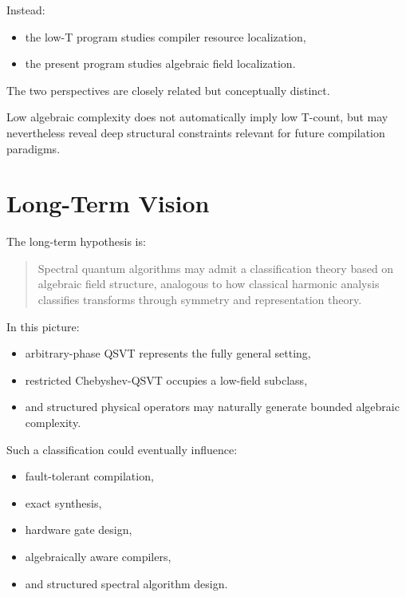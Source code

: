 \documentclass[12pt,a4paper]{article}
\begin{document}
Instead:

\begin{itemize}
    \item the low-T program studies compiler resource localization,
    \item the present program studies algebraic field localization.
\end{itemize}

The two perspectives are closely related but conceptually distinct.

Low algebraic complexity does not automatically imply low T-count, but may nevertheless reveal deep structural constraints relevant for future compilation paradigms.


\section{Long-Term Vision}

The long-term hypothesis is:

\begin{quote}
Spectral quantum algorithms may admit a classification theory based on algebraic field structure, analogous to how classical harmonic analysis classifies transforms through symmetry and representation theory.
\end{quote}

In this picture:

\begin{itemize}
    \item arbitrary-phase QSVT represents the fully general setting,
    \item restricted Chebyshev-QSVT occupies a low-field subclass,
    \item and structured physical operators may naturally generate bounded algebraic complexity.
\end{itemize}

Such a classification could eventually influence:

\begin{itemize}
    \item fault-tolerant compilation,
    \item exact synthesis,
    \item hardware gate design,
    \item algebraically aware compilers,
    \item and structured spectral algorithm design.
\end{itemize}
\end{document}

